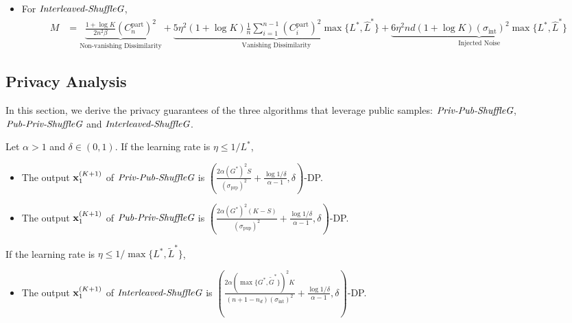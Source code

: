 \begin{corollary}
\begin{itemize}[itemsep=0mm]
        \item For \textbf{$\textit{Interleaved-ShuffleG}$},
            \begin{align*}
                M &= \underbrace{
                    \frac{1 + \log K}{2n^2 \beta} (C_n^{\text{part}})^2
                }_{\text{Non-vanishing Dissimilarity}}
                + \underbrace{
                    5 \eta^2 (1 + \log K) \frac{1}{n}\sum_{i=1}^{n-1} (C_{i}^{\text{part}})^2 \max\{L^*, \widehat{L}^*\}
                }_{\text{Vanishing Dissimilarity}}
                + \underbrace{
                    6 \eta^2 nd (1+\log K) (\sigma_{\text{int}})^2 \max\{ L^{*}, \widehat{L}^{*}\}
                }_{\text{Injected Noise}}
            \end{align*}
    \end{itemize}

\end{corollary}






\subsection{Privacy Analysis}
\label{subsec:appendix_algo_pub_data_privacy}

In this section, we derive the privacy guarantees of the three algorithms that leverage public samples: $\textit{Priv-Pub-ShuffleG}$, $\textit{Pub-Priv-ShuffleG}$ and $\textit{Interleaved-ShuffleG}$.

\begin{lemma}
\label{lemma:appendix_privacy_pub_data_opt}
    Let $\alpha > 1$ and $\delta \in (0, 1)$. If the learning rate is $\eta \leq 1/L^{*}$,
    \begin{itemize}[itemsep=0mm]
        \item The output ${\mathbf{x}}_1^{(K+1)}$ of \textit{$\textit{Priv-Pub-ShuffleG}$} is $(\frac{2 \alpha (G^*)^2 S}{(\sigma_{\text{prp}})^2} + \frac{\log 1/\delta}{\alpha-1}, \delta)$-DP.
        \item The output ${\mathbf{x}}_1^{(K+1)}$ of \textit{$\textit{Pub-Priv-ShuffleG}$} is $(\frac{2\alpha (G^*)^2 (K-S)}{(\sigma_{\text{pup}})^2} + \frac{\log 1/\delta}{\alpha-1}, \delta)$-DP.
    \end{itemize}
    If the learning rate is $\eta \leq 1/\max\{L^{*}, \widetilde{L}^{*}\}$,
    \begin{itemize}[itemsep=0mm]
        \item The output ${\mathbf{x}}_1^{(K+1)}$ of \textit{$\textit{Interleaved-ShuffleG}$} is $(\frac{2\alpha (\max\{G^{*}, \widetilde{G}^{*}\})^2 K}{(n+1 - n_d) (\sigma_{\text{int}})^2} + \frac{\log 1/\delta}{\alpha-1}, \delta)$-DP.
    \end{itemize}
\end{lemma}


